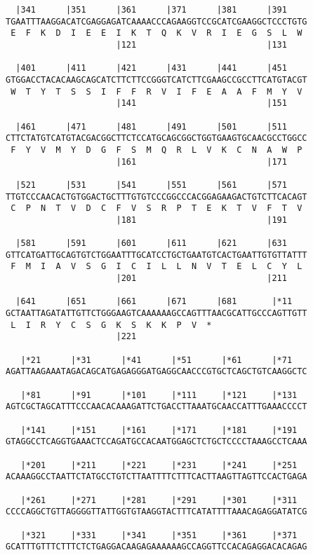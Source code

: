 \documentclass{article}
\begin{document}
\begin{Verbatim}
  |341      |351      |361      |371      |381      |391    
TGAATTTAAGGACATCGAGGAGATCAAAACCCAGAAGGTCCGCATCGAAGGCTCCCTGTG
 E  F  K  D  I  E  E  I  K  T  Q  K  V  R  I  E  G  S  L  W 
                      |121                          |131    
  
  |401      |411      |421      |431      |441      |451    
GTGGACCTACACAAGCAGCATCTTCTTCCGGGTCATCTTCGAAGCCGCCTTCATGTACGT
 W  T  Y  T  S  S  I  F  F  R  V  I  F  E  A  A  F  M  Y  V 
                      |141                          |151    
  
  |461      |471      |481      |491      |501      |511    
CTTCTATGTCATGTACGACGGCTTCTCCATGCAGCGGCTGGTGAAGTGCAACGCCTGGCC
 F  Y  V  M  Y  D  G  F  S  M  Q  R  L  V  K  C  N  A  W  P 
                      |161                          |171    
  
  |521      |531      |541      |551      |561      |571    
TTGTCCCAACACTGTGGACTGCTTTGTGTCCCGGCCCACGGAGAAGACTGTCTTCACAGT
 C  P  N  T  V  D  C  F  V  S  R  P  T  E  K  T  V  F  T  V 
                      |181                          |191    
  
  |581      |591      |601      |611      |621      |631    
GTTCATGATTGCAGTGTCTGGAATTTGCATCCTGCTGAATGTCACTGAATTGTGTTATTT
 F  M  I  A  V  S  G  I  C  I  L  L  N  V  T  E  L  C  Y  L 
                      |201                          |211    
  
  |641      |651      |661      |671      |681       |*11   
GCTAATTAGATATTGTTCTGGGAAGTCAAAAAAGCCAGTTTAACGCATTGCCCAGTTGTT
 L  I  R  Y  C  S  G  K  S  K  K  P  V  *   
                      |221                                  
  
   |*21      |*31      |*41      |*51      |*61      |*71   
AGATTAAGAAATAGACAGCATGAGAGGGATGAGGCAACCCGTGCTCAGCTGTCAAGGCTC
  
   |*81      |*91      |*101     |*111     |*121     |*131  
AGTCGCTAGCATTTCCCAACACAAAGATTCTGACCTTAAATGCAACCATTTGAAACCCCT
  
   |*141     |*151     |*161     |*171     |*181     |*191  
GTAGGCCTCAGGTGAAACTCCAGATGCCACAATGGAGCTCTGCTCCCCTAAAGCCTCAAA
  
   |*201     |*211     |*221     |*231     |*241     |*251  
ACAAAGGCCTAATTCTATGCCTGTCTTAATTTTCTTTCACTTAAGTTAGTTCCACTGAGA
  
   |*261     |*271     |*281     |*291     |*301     |*311  
CCCCAGGCTGTTAGGGGTTATTGGTGTAAGGTACTTTCATATTTTAAACAGAGGATATCG
  
   |*321     |*331     |*341     |*351     |*361     |*371  
GCATTTGTTTCTTTCTCTGAGGACAAGAGAAAAAAGCCAGGTTCCACAGAGGACACAGAG
  

\end{Verbatim}
\end{document}
